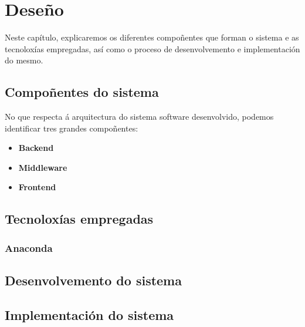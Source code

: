 \chapter{Deseño}

Neste capítulo, explicaremos  os diferentes compoñentes que forman o sistema e as tecnoloxías empregadas, así como o proceso de desenvolvemento e implementación do mesmo.

\section{Compoñentes do sistema}
No que respecta á arquitectura do sistema software desenvolvido, podemos identificar tres grandes compoñentes:
\begin{itemize}
    \item \textbf{Backend}

    \item \textbf{Middleware}

    \item \textbf{Frontend}

\end{itemize}

\section{Tecnoloxías empregadas}
\subsection{Anaconda}

\section{Desenvolvemento do sistema}

\section{Implementación do sistema}